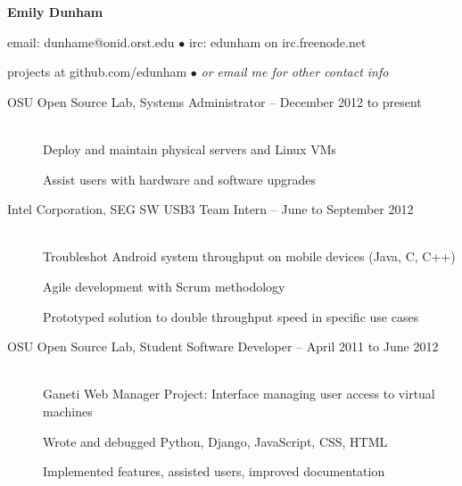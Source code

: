 \documentclass[11pt]{article}
\begin{document}
\centerline{{\LARGE \bf Emily Dunham}}

\bigskip

\centerline{email: dunhame@onid.orst.edu
        $\bullet$
        irc: edunham on irc.freenode.net}
\centerline{projects at github.com/edunham 
        $\bullet$
        \emph{or email me for other contact info}}

\bigskip
\hrulefill
\bigskip

\begin{description}
\item[OSU Open Source Lab, Systems Administrator -- December 2012 to present]
    \hfill \\
    Deploy and maintain physical servers and Linux VMs

    Assist users with hardware and software upgrades

\item[Intel Corporation, SEG SW USB3 Team Intern -- June to September
2012]
    \hfill \\
    Troubleshot Android system throughput on mobile devices (Java, C, C++)

    Agile development with Scrum methodology

    Prototyped solution to double throughput speed in specific use cases

\item[OSU Open Source Lab, Student Software Developer -- April 2011 to June
2012]
    \hfill \\
    Ganeti Web Manager Project: Interface managing user access to
    virtual machines

    Wrote and debugged Python, Django, JavaScript, CSS, HTML

    Implemented features, assisted users, improved documentation
\end{description}

\smallskip
\hrulefill
\bigskip
\end{document}
